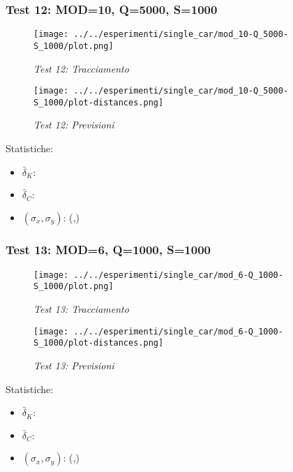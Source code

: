 \newpage
\subsubsection{Test 12: MOD=10, Q=5000, S=1000}

\begin{figure}[hb]
\centering
\texttt{[image: ../../esperimenti/single\_car/mod\_10-Q\_5000-S\_1000/plot.png]}
\caption{\textit{Test 12: Tracciamento}}
\end{figure}

\begin{figure}[hb]
\centering
\texttt{[image: ../../esperimenti/single\_car/mod\_10-Q\_5000-S\_1000/plot-distances.png]}
\caption{\textit{Test 12: Previsioni}}
\end{figure}

Statistiche:
\begin{itemize}
\item \begin{math} \bar \delta_K:  \end{math}
\item \begin{math} \bar \delta_C:  \end{math}
\item \begin{math}(\sigma_x,\sigma_y)\end{math}: (,)
\end{itemize}

\newpage
\subsubsection{Test 13: MOD=6, Q=1000, S=1000}

\begin{figure}[hb]
\centering
\texttt{[image: ../../esperimenti/single\_car/mod\_6-Q\_1000-S\_1000/plot.png]}
\caption{\textit{Test 13: Tracciamento}}
\end{figure}

\begin{figure}[hb]
\centering
\texttt{[image: ../../esperimenti/single\_car/mod\_6-Q\_1000-S\_1000/plot-distances.png]}
\caption{\textit{Test 13: Previsioni}}
\end{figure}

Statistiche:
\begin{itemize}
\item \begin{math} \bar \delta_K:  \end{math}
\item \begin{math} \bar \delta_C:  \end{math}
\item \begin{math}(\sigma_x,\sigma_y)\end{math}: (,)
\end{itemize}

